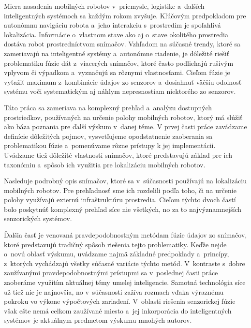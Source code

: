 Miera nasadenia mobilných robotov v~priemysle, logistike a~ďalších inteligentných systémoch sa každým rokom zvyšuje. Kľúčovým predpokladom pre autonómnu navigáciu robota a~jeho interakciu s~prostredím je spoľahlivá lokalizácia. Informácie o~vlastnom stave ako aj o~stave okolitého prostredia dostáva robot prostredníctvom snímačov. Vzhľadom na súčasné trendy, ktoré sa zameriavajú na inteligentné systémy a~autonómne riadenie, je dôležité riešiť problematiku fúzie dát z~viacerých snímačov, ktoré často podliehajú rušivým vplyvom či výpadkom a~vyznačujú sa rôznymi vlastnosťami. Cieľom fúzie je vyťažiť maximum z~kombinácie údajov zo senzorov a~dosiahnuť väčšiu odolnosť systému voči systematickým aj náhlym nepresnostiam niektorého zo senzorov.

Táto práca sa zameriava na komplexný prehľad a~analýzu dostupných prostriedkov, používaných na určenie polohy mobilných robotov, ktorý má slúžiť ako báza poznania pre ďalší výskum v~danej téme. V prvej časti práce zavádzame definície dôležitých pojmov, vysvetľujeme opodstatnenie zaoberania sa problematikou fúzie a~pomenúvame rôzne prístupy k jej implementácii. Uvádzame tiež dôležité vlastnosti snímačov, ktoré predstavujú základ pre ich taxonómiu a~spôsob ich využitia pre lokalizáciu mobilných robotov. 

Nasleduje podrobný opis snímačov, ktoré sa v~súčasnosti používajú na lokalizáciu mobilných robotov. Pre prehľadnosť sme ich rozdelili podľa toho, či na určenie polohy využívajú externú infraštruktúru prostredia. Cieľom týchto dvoch častí bolo poskytnúť komplexný prehľad síce nie všetkých, no za to najvýznamnejších senzorických systémov.

Ďalšia časť je venovaná pravdepodobnostným metódam fúzie údajov zo snímačov, ktoré predstavujú tradičný spôsob riešenia tejto problematiky. Keďže nejde o~novú oblasť výskumu, uvádzame najmä základné predpoklady a~princípy, z~ktorých vychádzajú všetky súčasné variácie týchto metód. V~kontraste s~dobre zaužívanými pravdepodobnostnými prístupmi sa v~poslednej časti práce zaoberáme využitím aktuálnej témy umelej inteligencie. Samotná technológia síce už tiež nie je najnovšia, no v~súčasnosti zažíva rozmach vďaka výraznému pokroku vo výkone výpočtových zariadení. V~oblasti riešenia senzorickej fúzie však ešte nemá celkom zaužívané miesto a~jej inkorporácia do inteligentných systémov je aktuálnym predmetom výskumu mnohých autorov.